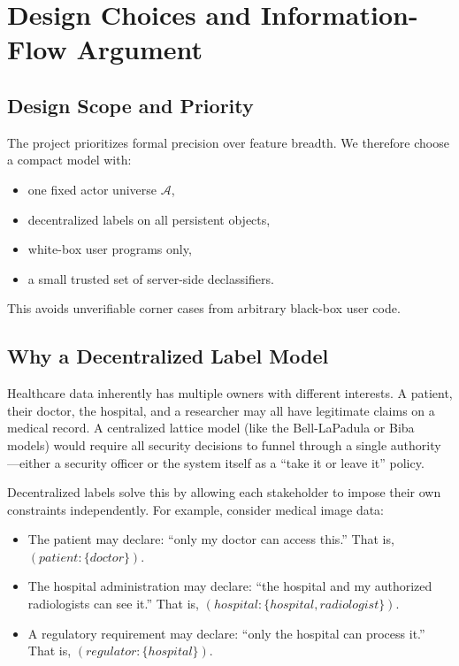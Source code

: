 \section{Design Choices and Information-Flow Argument}

\subsection{Design Scope and Priority}

The project prioritizes formal precision over feature breadth. We therefore choose a compact model with:
\begin{itemize}
    \item one fixed actor universe $\mathcal{A}$,
    \item decentralized labels on all persistent objects,
    \item white-box user programs only,
    \item a small trusted set of server-side declassifiers.
\end{itemize}

This avoids unverifiable corner cases from arbitrary black-box user code.

\subsection{Why a Decentralized Label Model}

Healthcare data inherently has multiple owners with different interests. A patient, their doctor, the hospital, and a researcher may all have legitimate claims on a medical record. A centralized lattice model (like the Bell-LaPadula or Biba models) would require all security decisions to funnel through a single authority—either a security officer or the system itself as a ``take it or leave it'' policy.

Decentralized labels solve this by allowing each stakeholder to impose their own constraints independently. For example, consider medical image data:
\begin{itemize}
    \item The patient may declare: ``only my doctor can access this.'' That is, $(patient:\{doctor\})$.
    \item The hospital administration may declare: ``the hospital and my authorized radiologists can see it.'' That is, $(hospital:\{hospital,radiologist\})$.
    \item A regulatory requirement may declare: ``only the hospital can process it.'' That is, $(regulator:\{hospital\})$.
\end{itemize}

